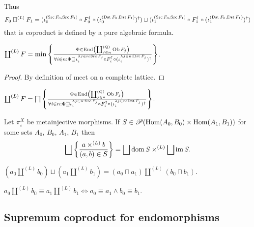 \begin{rem}
  Thus
  \[ F_0 \amalg^{(L)} F_1 = (\iota^{(\operatorname{Src} F_0 , \operatorname{Src} F_1)}_0 \circ
     F_0^{\dagger} \circ (\iota^{(\operatorname{Dst} F_0 , \operatorname{Dst}
     F_1)}_0)^{\dagger}) \sqcup (\iota^{(\operatorname{Src} F_0 , \operatorname{Src} F_1)}_1
     \circ F_1^{\dagger} \circ (\iota^{(\operatorname{Dst} F_0 , \operatorname{Dst}
     F_1)}_1)^{\dagger}) \]
  that is coproduct is defined by a pure algebraic formula.
\end{rem}

\begin{prop}
  $\coprod^{(L)} F = \min \left\{ \frac{ \Phi \in \operatorname{End} \left( \coprod^{(Q)}_{j
  \in n} \operatorname{Ob} F_j \right) }{ \forall i \in n :
  \Phi \sqsupseteq \iota^{\lambda j \in n : \operatorname{Src} F_j}_i \circ
  F_i^{\dagger} \circ (\iota^{\lambda j \in n : \operatorname{Dst} F_j}_i)^{\dagger} }\right\}$.
\end{prop}

\begin{proof}
  By definition of meet on a complete lattice.
\end{proof}

\begin{cor}
  $\coprod^{(L)} F = \bigsqcap \left\{ \frac{ \Phi \in \operatorname{End} \left(
  \coprod^{(Q)}_{j \in n} \operatorname{Ob} F_j \right) }{
  \forall i \in n : \Phi \sqsupseteq \iota^{\lambda j \in n : \operatorname{Src}
  F_j}_i \circ F_i^{\dagger} \circ (\iota^{\lambda j \in n : \operatorname{Dst}
  F_j}_i)^{\dagger} }\right\}$.
\end{cor}

\begin{thm}
  Let $\pi^X_i$ be metainjective morphisms. If $S \in \mathscr{P} (\operatorname{Hom}
  (A_0 , B_0) \times \operatorname{Hom} (A_1 , B_1))$ for some sets $A_0$, $B_0$,
  $A_1$, $B_1$ then
  \[ \bigsqcup \setcond{ a \times^{(L)} b }{ (a , b)
     \in S } = \bigsqcup \dom S \times^{(L)} \bigsqcup \im
     S. \]
\end{thm}

\begin{cor}
  $(a_0 \amalg^{(L)} b_0) \sqcup (a_1 \amalg^{(L)} b_1) = (a_0 \sqcap a_1)
  \amalg^{(L)} (b_0 \sqcap b_1)$.
\end{cor}

\begin{cor}
  $a_0 \amalg^{(L)} b_0 \equiv a_1 \amalg^{(L)} b_1 \Leftrightarrow a_0 \equiv
  a_1 \wedge b_0 \equiv b_1$.
\end{cor}

\subsection{Supremum coproduct for endomorphisms}


